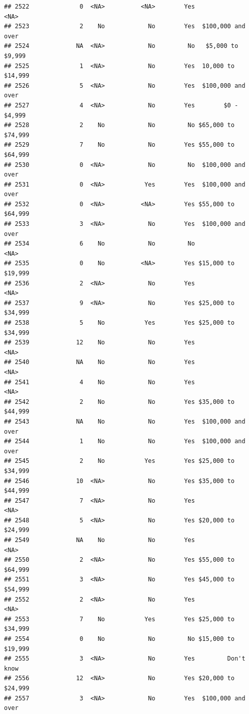 \documentclass[man]{apa6}
\begin{document}
\begin{verbatim}
## 2522              0  <NA>          <NA>        Yes               <NA>
## 2523              2    No            No        Yes  $100,000 and over
## 2524             NA  <NA>            No         No   $5,000 to $9,999
## 2525              1  <NA>            No        Yes  10,000 to $14,999
## 2526              5  <NA>            No        Yes  $100,000 and over
## 2527              4  <NA>            No        Yes        $0 - $4,999
## 2528              2    No            No         No $65,000 to $74,999
## 2529              7    No            No        Yes $55,000 to $64,999
## 2530              0  <NA>            No         No  $100,000 and over
## 2531              0  <NA>           Yes        Yes  $100,000 and over
## 2532              0  <NA>          <NA>        Yes $55,000 to $64,999
## 2533              3  <NA>            No        Yes  $100,000 and over
## 2534              6    No            No         No               <NA>
## 2535              0    No          <NA>        Yes $15,000 to $19,999
## 2536              2  <NA>            No        Yes               <NA>
## 2537              9  <NA>            No        Yes $25,000 to $34,999
## 2538              5    No           Yes        Yes $25,000 to $34,999
## 2539             12    No            No        Yes               <NA>
## 2540             NA    No            No        Yes               <NA>
## 2541              4    No            No        Yes               <NA>
## 2542              2    No            No        Yes $35,000 to $44,999
## 2543             NA    No            No        Yes  $100,000 and over
## 2544              1    No            No        Yes  $100,000 and over
## 2545              2    No           Yes        Yes $25,000 to $34,999
## 2546             10  <NA>            No        Yes $35,000 to $44,999
## 2547              7  <NA>            No        Yes               <NA>
## 2548              5  <NA>            No        Yes $20,000 to $24,999
## 2549             NA    No            No        Yes               <NA>
## 2550              2  <NA>            No        Yes $55,000 to $64,999
## 2551              3  <NA>            No        Yes $45,000 to $54,999
## 2552              2  <NA>            No        Yes               <NA>
## 2553              7    No           Yes        Yes $25,000 to $34,999
## 2554              0    No            No         No $15,000 to $19,999
## 2555              3  <NA>            No        Yes         Don't know
## 2556             12  <NA>            No        Yes $20,000 to $24,999
## 2557              3  <NA>            No        Yes  $100,000 and over

\end{verbatim}
\end{document}
